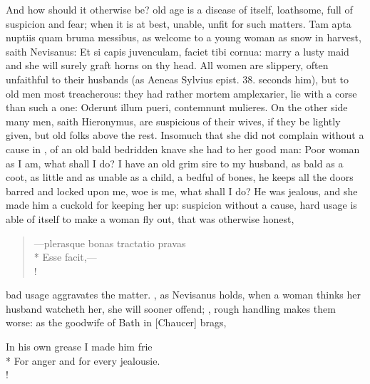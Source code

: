 And how should it otherwise be? old age is a disease of itself,
loathsome, full of suspicion and fear; when it is at best, unable,
unfit for such matters. Tam apta nuptiis quam bruma messibus, as
welcome to a young woman as snow in harvest, saith Nevisanus: Et si
capis juvenculam, faciet tibi cornua: marry a lusty maid and she will
surely graft horns on thy head. All women are slippery, often
unfaithful to their husbands (as Aeneas Sylvius epist. 38. seconds
him), but to old men most treacherous: they had rather mortem
amplexarier, lie with a corse than such a one: Oderunt illum
pueri, contemnunt mulieres. On the other side many men, saith
Hieronymus, are suspicious of their wives, if they be lightly
given, but old folks above the rest. Insomuch that she did not complain
without a cause in \Apuleius{}, of an old bald bedridden knave she
had to her good man: Poor woman as I am, what shall I do? I have an old
grim sire to my husband, as bald as a coot, as little and as unable as
a child, a bedful of bones, he keeps all the doors barred and locked
upon me, woe is me, what shall I do? He was jealous, and she made him a
cuckold for keeping her up: suspicion without a cause, hard usage is
able of itself to make a woman fly out, that was otherwise honest,
%
\begin{latin}%
\begin{verse}%
---plerasque bonas tractatio pravas\\*
Esse facit,---\\!
\end{verse}%
\end{latin}%
%
%
bad usage aggravates the matter. , as Nevisanus holds, when a
woman thinks her husband watcheth her, she will sooner offend;
, rough handling makes them
worse: as the goodwife of Bath in [Chaucer] brags,
%
{\gothfont%
\begin{versewithlinenos}{2}{1}{1}%
In his own grease I made him frie\\*
For anger and for every jealousie.\\!
\end{versewithlinenos}%
}%

